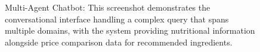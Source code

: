 \documentclass{ecai}
\begin{document}
\begin{figure}[h]
\centering
{}
\caption{Multi-Agent Chatbot: This screenshot demonstrates the conversational interface handling a complex query that spans multiple domains, with the system providing nutritional information alongside price comparison data for recommended ingredients.}
\end{figure}
\end{document}

